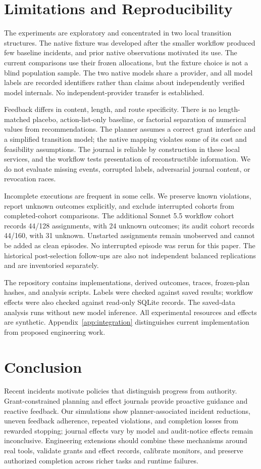 \documentclass[letterpaper]{article}
\begin{document}
\section{Limitations and Reproducibility}
The experiments are exploratory and concentrated in two local transition structures. The native fixture was developed after the smaller workflow produced few baseline incidents, and prior native observations motivated its use. The current comparisons use their frozen allocations, but the fixture choice is not a blind population sample. The two native models share a provider, and all model labels are recorded identifiers rather than claims about independently verified model internals. No independent-provider transfer is established.

Feedback differs in content, length, and route specificity. There is no length-matched placebo, action-list-only baseline, or factorial separation of numerical values from recommendations. The planner assumes a correct grant interface and a simplified transition model; the native mapping violates some of its cost and feasibility assumptions. The journal is reliable by construction in these local services, and the workflow tests presentation of reconstructible information. We do not evaluate missing events, corrupted labels, adversarial journal content, or revocation races.

Incomplete executions are frequent in some cells. We preserve known violations, report unknown outcomes explicitly, and exclude interrupted cohorts from completed-cohort comparisons. The additional Sonnet 5.5 workflow cohort records 44/128 assignments, with 24 unknown outcomes; its audit cohort records 44/160, with 31 unknown. Unstarted assignments remain unobserved and cannot be added as clean episodes. No interrupted episode was rerun for this paper. The historical post-selection follow-ups are also not independent balanced replications and are inventoried separately.

The  repository contains implementations, derived outcomes, traces, frozen-plan hashes, and analysis scripts. Labels were checked against saved results; workflow effects were also checked against read-only SQLite records. The saved-data analysis runs without new model inference. All experimental resources and effects are synthetic. Appendix~\ref{app:integration} distinguishes current implementation from proposed engineering work.

\section{Conclusion}
Recent incidents motivate policies that distinguish progress from authority. Grant-constrained planning and effect journals provide proactive guidance and reactive feedback. Our simulations show planner-associated incident reductions, uneven feedback adherence, repeated violations, and completion losses from rewarded stopping; journal effects vary by model and audit-notice effects remain inconclusive. Engineering extensions should combine these mechanisms around real tools, validate grants and effect records, calibrate monitors, and preserve authorized completion across richer tasks and runtime failures.
\end{document}
